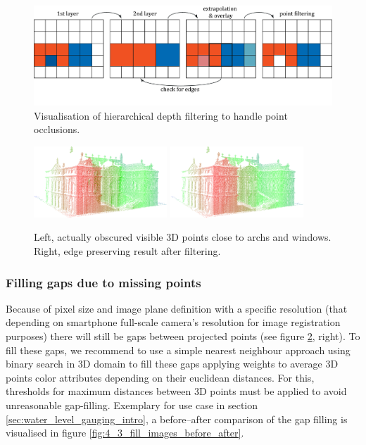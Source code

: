 \documentclass[review]{elsarticle}
\begin{document}
\begin{figure}[h]
\centering
\includegraphics[width=12cm]{graphics/4_3_point_filtering}
\caption{Visualisation of hierarchical depth filtering to handle point occlusions.}
\label{fig:4_3_point_filtering}
\end{figure}
\begin{figure}[h]
\centering
\includegraphics[width=5cm]{graphics/4_3_dist_image_orig}%
\includegraphics[width=5cm]{graphics/4_3_dist_image_filt}%
\caption{Left, actually obscured visible 3D points close to archs and windows. Right, edge preserving result after filtering.}
\label{fig:4_3_dist_images}
\end{figure}


\subsubsection{Filling gaps due to missing points}
Because of pixel size and image plane definition with a specific resolution (that depending on smartphone full-scale camera's resolution for image registration purposes) there will still be gaps between projected points (see figure \ref{fig:4_3_dist_images}, right). To fill these gaps, we recommend to use a simple nearest neighbour approach using binary search \cite{Bentley1975} in 3D domain to fill these gaps applying weights to average 3D points color attributes depending on their euclidean distances. For this, thresholds for maximum distances between 3D points must be applied to avoid unreasonable gap-filling. Exemplary for use case in section \ref{sec:water_level_gauging_intro}, a before--after comparison of the gap filling is visualised in figure \ref{fig:4_3_fill_images_before_after}.
\end{document}
